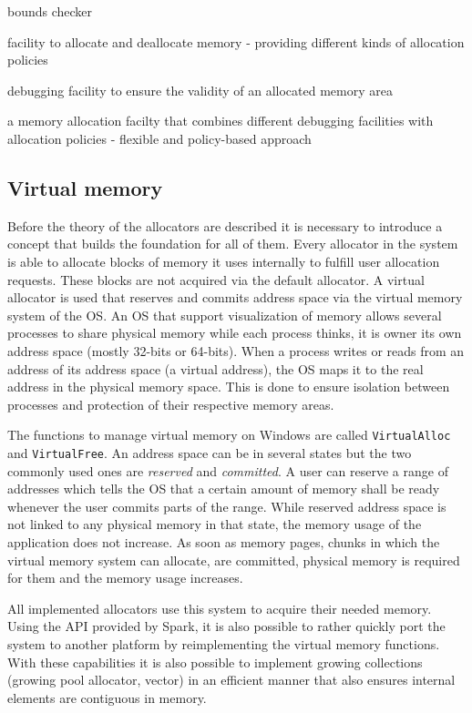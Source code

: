 \begin{labeling}{bounds checker}
	\item [allocator] facility to allocate and deallocate memory - providing different kinds of allocation policies
	\item [bounds checker] debugging facility to ensure the validity of an allocated memory area
	\item [memory realm] a memory allocation facilty that combines different 
	debugging facilities with allocation policies - flexible and policy-based approach
\end{labeling}

\subsection{Virtual memory}

Before the theory of the allocators are described it is necessary to introduce a concept that builds the foundation for all of them. Every allocator in the system is able to allocate blocks of memory it uses internally to fulfill user allocation requests. These blocks are not acquired via the default allocator. A virtual allocator is used that reserves and commits address space via the virtual memory system of the \ac{OS}. An \ac{OS} that support visualization of memory allows several processes to share physical memory while each process thinks, it is owner its own address space (mostly 32-bits or 64-bits). When a process writes or reads from an address of its address space (a virtual address), the \ac{OS} maps it to the real address in the physical memory space. This is done to ensure isolation between processes and protection of their respective memory areas.

The functions to manage virtual memory on Windows are called \texttt{VirtualAlloc} and \texttt{VirtualFree}. An address space can be in several states but the two commonly used ones are \textit{reserved} and \textit{committed}. A user can reserve a range of addresses which tells the \ac{OS} that a certain amount of memory shall be ready whenever the user commits parts of the range. While reserved address space is not linked to any physical memory in that state, the memory usage of the application does not increase. As soon as memory pages, chunks in which the virtual memory system can allocate, are committed, physical memory is required for them and the memory usage increases. 

All implemented allocators use this system to acquire their needed memory. Using the \ac{API} provided by Spark, it is also possible to rather quickly port the system to another platform by reimplementing the virtual memory functions. With these capabilities it is also possible to implement growing collections (growing pool allocator, vector) in an efficient manner that also ensures internal elements are contiguous in memory. \cite[p. 3-5]{VMEM}

